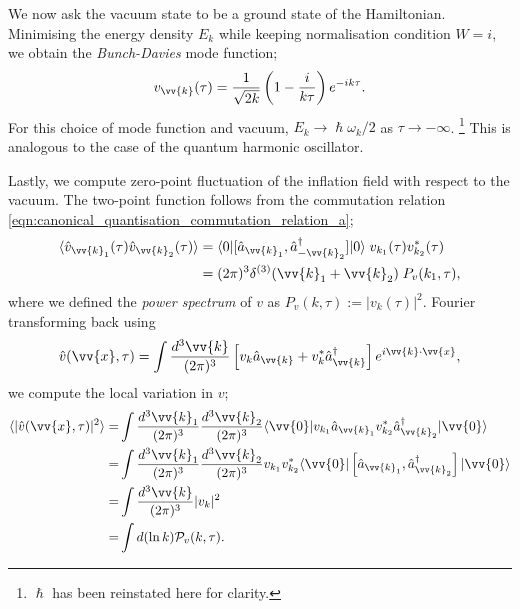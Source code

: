 \documentclass[a4paper,12pt,times,custombib,print,index]{Classes/PhDThesisPSnPDF} %
\providecommand{\DIFadd}[1]{{\protect\color{blue}\uwave{#1}}} %
\providecommand{\DIFaddbegin}{} %
\providecommand{\DIFaddend}{} %
\providecommand{\DIFdelbegin}{} %
\providecommand{\DIFdelend}{} %
\newcommand{\DIFscaledelfig}{0.5}
\newlength{\DIFdelgraphicswidth} %
\newlength{\DIFdelgraphicsheight} %
\newcommand{\DIFaddincludegraphics}[2][]{{\color{blue}\fbox{\DIFOincludegraphics[#1]{#2}}}} %
\newcommand{\DIFdelincludegraphics}[2][]{%
\sbox{\DIFdelgraphicsbox}{\DIFOincludegraphics[#1]{#2}}%
\settoboxwidth{\DIFdelgraphicswidth}{\DIFdelgraphicsbox} %
\settoboxtotalheight{\DIFdelgraphicsheight}{\DIFdelgraphicsbox} %
\scalebox{\DIFscaledelfig}{%
\parbox[b]{\DIFdelgraphicswidth}{\usebox{\DIFdelgraphicsbox}\\[-\baselineskip] \rule{\DIFdelgraphicswidth}{0em}}\llap{\resizebox{\DIFdelgraphicswidth}{\DIFdelgraphicsheight}{%
\setlength{\unitlength}{\DIFdelgraphicswidth}%
\begin{picture}(1,1)%
\thicklines\linethickness{2pt} %
{\color[rgb]{1,0,0}\put(0,0){\framebox(1,1){}}}%
{\color[rgb]{1,0,0}\put(0,0){\line( 1,1){1}}}%
{\color[rgb]{1,0,0}\put(0,1){\line(1,-1){1}}}%
\end{picture}%
}\hspace*{3pt}}} %
} %
\DeclareRobustCommand{\DIFaddbegin}{\DIFOaddbegin \let\includegraphics\DIFaddincludegraphics} %
\DeclareRobustCommand{\DIFaddend}{\DIFOaddend \let\includegraphics\DIFOincludegraphics} %
\DeclareRobustCommand{\DIFdelbegin}{\DIFOdelbegin \let\includegraphics\DIFdelincludegraphics} %
\DeclareRobustCommand{\DIFdelend}{\DIFOaddend \let\includegraphics\DIFOincludegraphics} %
\begin{document}
We now ask the vacuum state to be a ground state of the Hamiltonian. Minimising the energy density $E_k$ while keeping normalisation condition $W=i$, we obtain the \textit{Bunch-Davies} mode function;
\begin{align}
	v_\vv{k}(\tau) = \frac{1}{\sqrt{2k}} \left( 1 - \frac{i}{k\tau} \right) e^{-ik\tau}. \DIFdelbegin %
\DIFdelend \DIFaddbegin \label{eqn:bunch_davies_mode_function}
\DIFaddend \end{align}
For this choice of mode function and vacuum, $E_k \rightarrow \hslash\omega_k/2$ as $\tau \rightarrow -\infty$. \footnote{$\hslash$ has been reinstated here for clarity.} This is analogous to the case of the quantum harmonic oscillator.

Lastly, we compute \DIFaddbegin \DIFadd{the }\DIFaddend zero-point fluctuation of the inflation field with respect to the vacuum. The two-point function follows from the commutation relation \eqref{eqn:canonical_quantisation_commutation_relation_a};
\begin{align}
	\langle \hat{v}_{\vv{k}_1} (\tau) \hat{v}_{\vv{k}_2} (\tau) \rangle &= \langle 0| [\hat{a}_{\vv{k}_1}, \hat{a}^\dagger_{-\vv{k}_2}] |0 \rangle \; v_{k_1}(\tau) v^*_{k_2}(\tau) \\
	&= (2\pi)^3 \delta^{(3)} (\vv{k}_1 + \vv{k}_2 ) \; P_{v}(k_1,\tau),   \label{eqn:single_field_inflation_power_spectrum}
\end{align}
where we defined the \textit{power spectrum} of $v$ as $P_v(k,\tau) := |v_k(\tau)|^2$. Fourier transforming back using
\begin{align}
	\hat{v}(\vv{x}, \tau) = \int \frac{d^3\vv{k}}{(2\pi)^3} \left[ v_k \hat{a}_\vv{k} + v^*_k \hat{a}^\dagger_\vv{k} \right] e^{i\vv{k} \cdot \vv{x}},
\end{align}
we compute the local variation in $v$;
\begin{align}
	\langle | \hat{v}(\vv{x}, \tau) |^2 \rangle =& \int \frac{d^3\vv{k}_1}{(2\pi)^3} \frac{d^3\vv{k}_2}{(2\pi)^3} \langle \vv{0} | v_{k_1} \hat{a}_{\vv{k}_1} v^*_{k_2} \hat{a}^\dagger_{\vv{k}_2} | \vv{0} \rangle 	\\
	=& \int \frac{d^3\vv{k}_1}{(2\pi)^3} \frac{d^3\vv{k}_2}{(2\pi)^3} v_{k_1} v^*_{k_2} \langle \vv{0} | \left[ \hat{a}_{\vv{k}_1}, \hat{a}^\dagger_{\vv{k}_2} \right] | \vv{0} \rangle	 \\
	=& \int \frac{d^3\vv{k}}{(2\pi)^3} |v_k|^2	\\
	=& \int d(\ln k) \mathcal{P}_v (k,\tau).
\end{align}
\end{document}
